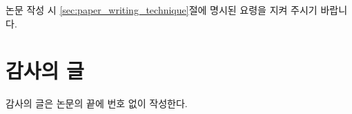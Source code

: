 \documentclass[a4paper,twocolumn]{article}
\begin{document}
논문 작성 시 \ref{sec:paper_writing_technique}절에 명시된 요령을 지켜 주시기 바랍니다.


\section*{감사의 글}

감사의 글은 논문의 끝에 번호 없이 작성한다.



\nocite{*}


\end{document}
